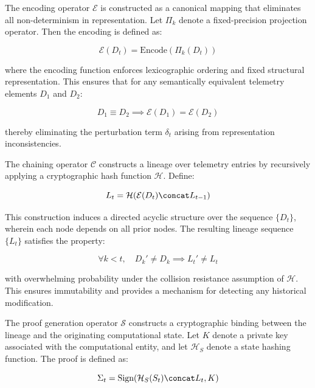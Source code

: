 The encoding operator $\mathcal{E}$ is constructed as a canonical mapping that eliminates all non-determinism in representation. Let $\Pi_k$ denote a fixed-precision projection operator. Then the encoding is defined as:

\begin{equation}
\mathcal{E}(D_t) = \text{Encode}(\Pi_k(D_t))
\end{equation}

where the encoding function enforces lexicographic ordering and fixed structural representation. This ensures that for any semantically equivalent telemetry elements $D_1$ and $D_2$:

\begin{equation}
D_1 \equiv D_2 \implies \mathcal{E}(D_1) = \mathcal{E}(D_2)
\end{equation}

thereby eliminating the perturbation term $\delta_t$ arising from representation inconsistencies.

The chaining operator $\mathcal{C}$ constructs a lineage over telemetry entries by recursively applying a cryptographic hash function $\mathcal{H}$. Define:

\begin{equation}
L_t = \mathcal{H}(\mathcal{E}(D_t) \concat L_{t-1})
\end{equation}

This construction induces a directed acyclic structure over the sequence $\{D_t\}$, wherein each node depends on all prior nodes. The resulting lineage sequence $\{L_t\}$ satisfies the property:

\begin{equation}
\forall k < t, \quad D_k' \neq D_k \implies L_t' \neq L_t
\end{equation}

with overwhelming probability under the collision resistance assumption of $\mathcal{H}$. This ensures immutability and provides a mechanism for detecting any historical modification.

The proof generation operator $\mathcal{S}$ constructs a cryptographic binding between the lineage and the originating computational state. Let $K$ denote a private key associated with the computational entity, and let $\mathcal{H}_S$ denote a state hashing function. The proof is defined as:

\begin{equation}
\Sigma_t = \text{Sign}(\mathcal{H}_S(S_t) \concat L_t, K)
\end{equation}

